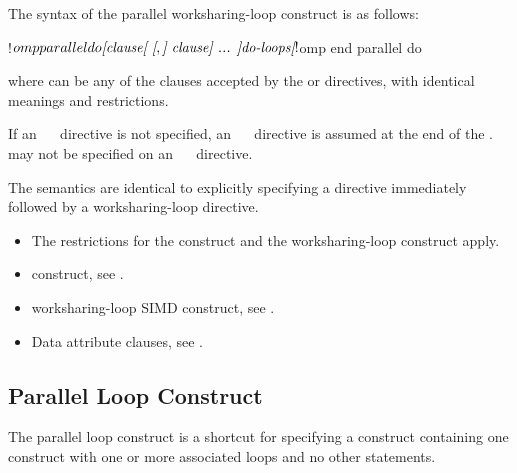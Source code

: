 \begin{fortranspecific}
The syntax of the parallel worksharing-loop construct is as follows:

\begin{ompfPragma}
!$omp parallel do \plc{[clause[ [},\plc{] clause] ... ]}
   \plc{do-loops}
\plc{[}!$omp end parallel do\plc{]}
\end{ompfPragma}

where  can be any of the clauses accepted by the  or  directives,
with identical meanings and restrictions.

If an ~~ directive is not specified, an ~~ directive is
assumed at the end of the .  may not be specified on an
~~ directive.
\end{fortranspecific}

\descr
The semantics are identical to explicitly specifying a  directive immediately
followed by a worksharing-loop directive.

\restrictions
\begin{itemize}
\item The restrictions for the  construct and the
    worksharing-loop construct apply.
\end{itemize}

\crossreferences
\begin{itemize}
\item {} construct, see
.

\item worksharing-loop SIMD construct, see
.

\item Data attribute clauses, see
.
\end{itemize}




\subsection{Parallel Loop Construct}
\label{subsec:Parallel Loop Construct}
\summary
The parallel loop construct is a shortcut for specifying a  construct
containing one  construct with one or more associated loops and no other statements.

